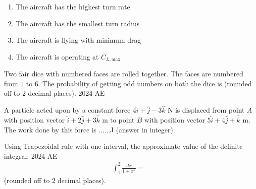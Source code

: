     \begin{enumerate}
        \item The aircraft has the highest turn rate
        \item The aircraft has the smallest turn radius
        \item The aircraft is flying with minimum drag
        \item The aircraft is operating at $C_{L,\text{max}}$
    \end{enumerate}

    \item Two fair dice with numbered faces are rolled together. The faces are numbered from $1$ to $6$. The probability of getting odd numbers on both the dice is (rounded off to 2 decimal places).
 \hfill{2024-AE}
    \item A particle acted upon by a constant force $4\hat{i} + \hat{j} - 3\hat{k}$ N is displaced from point $A$ with position vector $\hat{i} + 2\hat{j} + 3\hat{k}$ m to point $B$ with position vector $5\hat{i} + 4\hat{j} + \hat{k}$ m. The work done by this force is ......J (answer in integer).

    \item Using Trapezoidal rule with one interval, the approximate value of the definite integral:
     \hfill{2024-AE}
\begin{align*}
\int_{1}^{2} \frac{dx}{1 + x^2} = 
\end{align*}
(rounded off to 2 decimal places).

